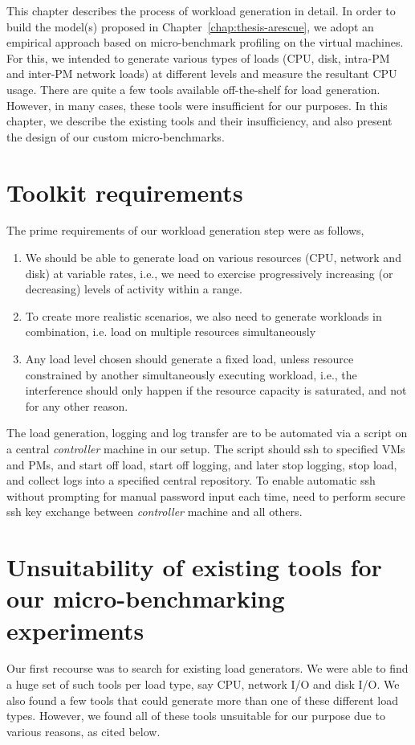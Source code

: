 This chapter describes the process of workload generation in detail. 
In order to build the model(s) proposed in Chapter~\ref{chap:thesis-arescue},
we adopt an empirical approach based on micro-benchmark profiling on the virtual
machines. For this, we intended to generate various types of loads 
(CPU, disk, intra-PM and inter-PM network loads) at different levels 
and measure the resultant CPU usage. There are quite a few tools 
available off-the-shelf for load generation. However, in many cases, these tools were
insufficient for our purposes. In this chapter, we describe the existing 
tools and their insufficiency, and also present the design of our
custom micro-benchmarks.

\section{Toolkit requirements}
The prime requirements of our workload generation step were as follows,
\begin{enumerate}
  \item We should be able to generate
load on various resources (CPU, network and disk) at variable rates, i.e., we need to exercise
progressively increasing (or decreasing) levels of activity within a range. 
  \item To create more realistic scenarios, we also need to generate workloads in combination, i.e.
load on multiple resources simultaneously
  \item Any load level chosen should generate a fixed
load, unless resource constrained by another simultaneously executing workload, i.e., the interference
should only happen if the resource capacity is saturated, and not for any other reason.
\end{enumerate}

The load generation, logging and log transfer are to be automated via a script on a central
\textit{controller} machine in our setup. The script should ssh to specified VMs and PMs,
and start off load, start off logging, and later stop logging, stop load, and collect logs
into a specified central repository. To enable automatic ssh without prompting for manual
password input each time, 
need to perform secure ssh key exchange between \textit{controller} machine and all others.


\section{Unsuitability of existing tools for our micro-benchmarking experiments}
Our
first recourse was to search for existing load generators. We were able to find a huge set of
such tools per load type, say CPU, network I/O and disk I/O. We also found a few tools that
could generate more than one of these different load types. However, we found all of these tools
unsuitable for our purpose due to various reasons, as cited below.

